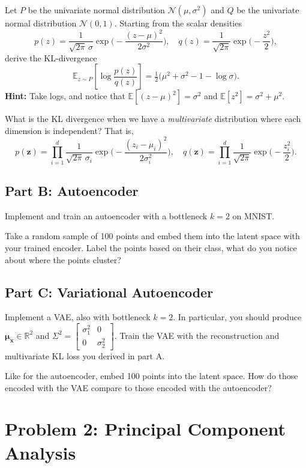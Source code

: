 \documentclass{article}
\begin{document}
Let $P$ be the univariate normal distribution $\mathcal{N}(\mu,\sigma^2)$ and $Q$ be the univariate normal distribution $\mathcal{N}(0,1)$.
Starting from the scalar densities
$$
  p(z)=\frac{1}{\sqrt{2\pi}\,\sigma}\exp\!\Big(-\frac{(z-\mu)^2}{2\sigma^2}\Big),\quad
  q(z)=\frac{1}{\sqrt{2\pi}}\exp\!\Big(-\frac{z^2}{2}\Big),
$$
derive the KL-divergence
$$
  \mathbb{E}_{z\sim P}\left[\log \frac{p(z)}{q(z)}\right]
  =\tfrac12\big(\mu^2+\sigma^2-1-\log\sigma\big).
$$
\textbf{Hint:} Take logs, and notice that $\mathbb{E}[(z-\mu)^2]=\sigma^2$ and $\mathbb{E}[z^2]=\sigma^2+\mu^2$. 

What is the KL divergence when we have a \textit{multivariate} distribution where each dimension is independent? That is,
$$
  p(\mathbf{z})=\prod_{i=1}^d \frac{1}{\sqrt{2\pi}\,\sigma_i}\exp\!\Big(-\frac{(z_i-\mu_i)^2}{2\sigma_i^2}\Big),\quad
  q(\mathbf{z})=\prod_{i=1}^d \frac{1}{\sqrt{2\pi}}\exp\!\Big(-\frac{z_i^2}{2}\Big).
$$

\subsection*{Part B: Autoencoder}

Implement and train an autoencoder with a bottleneck $k=2$ on MNIST.

Take a random sample of 100 points and embed them into the latent space with your trained encoder.
Label the points based on their class, what do you notice about where the points cluster?


\subsection*{Part C: Variational Autoencoder}

Implement a VAE, also with bottleneck $k=2$. In particular, you should produce $\mathbf{\mu_x} \in \mathbb{R}^2$ and $\Sigma^2 = \begin{bmatrix}\sigma_1^2 & 0 \\ 0 & \sigma_2^2\end{bmatrix}$.
Train the VAE with the reconstruction and multivariate KL loss you derived in part A.

Like for the autoencoder, embed 100 points into the latent space.
How do those encoded with the VAE compare to those encoded with the autoencoder?

%

\newpage
\section*{Problem 2: Principal Component Analysis}
\end{document}
